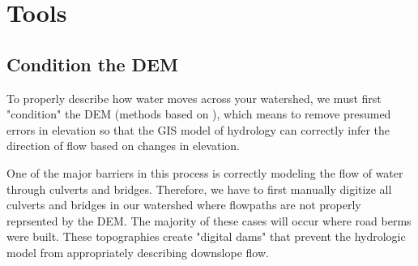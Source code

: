 \documentclass{article}
\begin{document}
\section{Tools}
	\subsection{Condition the DEM}
		To properly describe how water moves across your watershed, we must first "condition" the DEM (methods based on \cite{vaughn_method_2010}), which means to remove presumed errors in elevation so that the GIS model of hydrology can correctly infer the direction of flow based on changes in elevation.
		
		One of the major barriers in this process is correctly modeling the flow of water through culverts and bridges. Therefore, we have to first manually digitize all culverts and bridges in our watershed where flowpaths are not properly reprsented by the DEM. The majority of these cases will occur where road berms were built. These topographies create "digital dams" that prevent the hydrologic model from appropriately describing downslope flow. 
		
\end{document}
